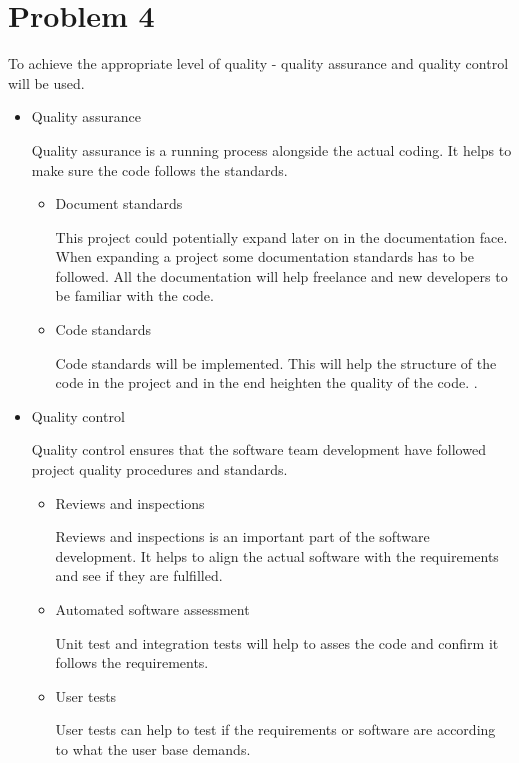 \chapter{Problem 4}
To achieve the appropriate level of quality - quality assurance and quality control will be used.
\begin{itemize}
	\setlength\itemsep{0.1em}
	\item Quality assurance	
	
		Quality assurance is a running process alongside the actual coding. It helps to make sure the code follows the standards.
	\begin{itemize}
		\item Document standards
		
			This project could potentially expand later on in the documentation face. When expanding a project some documentation standards has to be followed. All the documentation will help freelance and new developers to be familiar with the code.  
		\item Code standards
		
			Code standards will be implemented. This will help the structure of the code in the project and in the end heighten the quality of the code.
			. 
	\end{itemize}
	\item Quality control
		
		Quality control ensures that the software team development have followed project quality procedures and standards.
	\begin{itemize}
		\item Reviews and inspections
		
			Reviews and inspections is an important part of the software development. It helps to align the actual software with the requirements and see if they are fulfilled.
		\item Automated software assessment
		
			Unit test and integration tests will help to asses the code and confirm it follows the requirements. 
		\item User tests
			
			User tests can help to test if the requirements or software are according to what the user base demands. 
	\end{itemize}
\end{itemize}